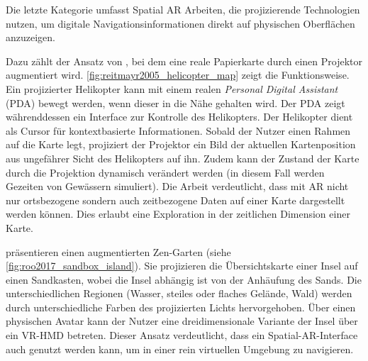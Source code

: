 Die letzte Kategorie umfasst Spatial AR Arbeiten, die projizierende Technologien nutzen, um digitale Navigationsinformationen direkt auf physischen Oberflächen anzuzeigen.

Dazu zählt der Ansatz von \textcite{Reitmayr2005}, bei dem eine reale Papierkarte durch einen Projektor augmentiert wird.
\autoref{fig:reitmayr2005_helicopter_map} zeigt die Funktionsweise.
Ein projizierter Helikopter kann mit einem realen \emph{Personal Digital Assistant} (PDA) bewegt werden, wenn dieser in die Nähe gehalten wird.
Der PDA zeigt währenddessen ein Interface zur Kontrolle des Helikopters.
Der Helikopter dient als Cursor für kontextbasierte Informationen.
Sobald der Nutzer einen Rahmen auf die Karte legt, projiziert der Projektor ein Bild der aktuellen Kartenposition aus ungefährer Sicht des Helikopters auf ihn.
Zudem kann der Zustand der Karte durch die Projektion dynamisch verändert werden (in diesem Fall werden Gezeiten von Gewässern simuliert).
Die Arbeit verdeutlicht, dass mit AR nicht nur ortsbezogene sondern auch zeitbezogene Daten auf einer Karte dargestellt werden können.
Dies erlaubt eine Exploration in der zeitlichen Dimension einer Karte.

\textcite{Roo2017} präsentieren einen augmentierten Zen-Garten (siehe \autoref{fig:roo2017_sandbox_island}).
Sie projizieren die Übersichtskarte einer Insel auf einen Sandkasten, wobei die Insel abhängig ist von der Anhäufung des Sands.
Die unterschiedlichen Regionen (Wasser, steiles oder flaches Gelände, Wald) werden durch unterschiedliche Farben des projizierten Lichts hervorgehoben.
Über einen physischen Avatar kann der Nutzer eine dreidimensionale Variante der Insel über ein VR-HMD betreten.
Dieser Ansatz verdeutlicht, dass ein Spatial-AR-Interface auch genutzt werden kann, um in einer rein virtuellen Umgebung zu navigieren.

